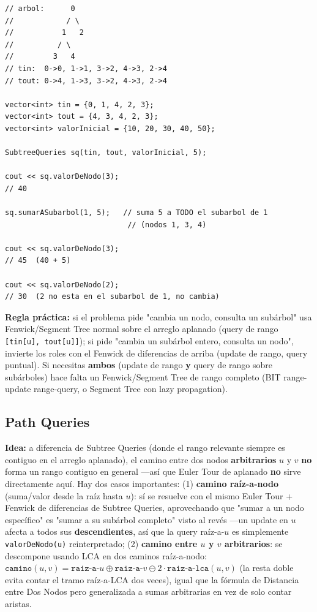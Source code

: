 \documentclass[10pt,a4paper,twocolumn]{article}
\begin{document}
\begin{lstlisting}[style=cpp]
// arbol:      0
//            / \
//           1   2
//          / \
//         3   4
// tin:  0->0, 1->1, 3->2, 4->3, 2->4
// tout: 0->4, 1->3, 3->2, 4->3, 2->4

vector<int> tin = {0, 1, 4, 2, 3};
vector<int> tout = {4, 3, 4, 2, 3};
vector<int> valorInicial = {10, 20, 30, 40, 50};

SubtreeQueries sq(tin, tout, valorInicial, 5);

cout << sq.valorDeNodo(3);
// 40

sq.sumarASubarbol(1, 5);   // suma 5 a TODO el subarbol de 1
                            // (nodos 1, 3, 4)

cout << sq.valorDeNodo(3);
// 45  (40 + 5)

cout << sq.valorDeNodo(2);
// 30  (2 no esta en el subarbol de 1, no cambia)
\end{lstlisting}

\textbf{Regla práctica:} si el problema pide "cambia un nodo, consulta
un subárbol" usa Fenwick/Segment Tree normal sobre el arreglo
aplanado (query de rango \texttt{[tin[u], tout[u]]}); si pide
"cambia un subárbol entero, consulta un nodo", invierte los roles con
el Fenwick de diferencias de arriba (update de rango, query
puntual). Si necesitas \textbf{ambos} (update de rango \textbf{y}
query de rango sobre subárboles) hace falta un Fenwick/Segment Tree
de rango completo (BIT range-update range-query, o Segment Tree con
lazy propagation).


\subsection{Path Queries}

\textbf{Idea:} a diferencia de Subtree Queries (donde el rango
relevante siempre es contiguo en el arreglo aplanado), el camino
entre dos nodos \textbf{arbitrarios} $u$ y $v$ \textbf{no} forma un
rango contiguo en general —así que Euler Tour de aplanado
\textbf{no} sirve directamente aquí. Hay dos casos importantes: (1)
\textbf{camino raíz-a-nodo} (suma/valor desde la raíz hasta $u$): sí
se resuelve con el mismo Euler Tour + Fenwick de diferencias de
Subtree Queries, aprovechando que "sumar a un nodo específico" es
"sumar a su subárbol completo" visto al revés —un update en $u$
afecta a todos sus \textbf{descendientes}, así que la query
raíz-a-$u$ es simplemente \texttt{valorDeNodo(u)} reinterpretado; (2)
\textbf{camino entre $u$ y $v$ arbitrarios}: se descompone usando LCA
en dos caminos raíz-a-nodo: $\texttt{camino}(u,v) =
\texttt{raiz-a-}u \oplus \texttt{raiz-a-}v \ominus 2\cdot
\texttt{raiz-a-}\texttt{lca}(u,v)$ (la resta doble evita contar el
tramo raíz-a-LCA dos veces), igual que la fórmula de Distancia entre
Dos Nodos pero generalizada a sumas arbitrarias en vez de solo
contar aristas.
\end{document}
